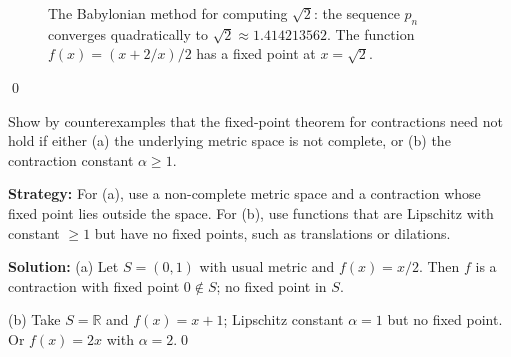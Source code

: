 \begin{figure}[h]
\centering
{}
\caption{The Babylonian method for computing $\sqrt{2}$: the sequence $p_n$ converges quadratically to $\sqrt{2} \approx 1.414213562$. The function $f(x) = (x + 2/x)/2$ has a fixed point at $x = \sqrt{2}$.}
\end{figure}\qed



\begin{problembox}
Show by counterexamples that the fixed-point theorem for contractions need not hold if either (a) the underlying metric space is not complete, or (b) the contraction constant $\alpha \ge 1$.
\end{problembox}

\noindent\textbf{Strategy:} For (a), use a non-complete metric space and a contraction whose fixed point lies outside the space. For (b), use functions that are Lipschitz with constant $\geq 1$ but have no fixed points, such as translations or dilations.

\bigskip\noindent\textbf{Solution:}
(a) Let $S=(0,1)$ with usual metric and $f(x)=x/2$. Then $f$ is a contraction with fixed point $0\notin S$; no fixed point in $S$.

(b) Take $S=\mathbb{R}$ and $f(x)=x+1$; Lipschitz constant $\alpha=1$ but no fixed point. Or $f(x)=2x$ with $\alpha=2$.\qed



